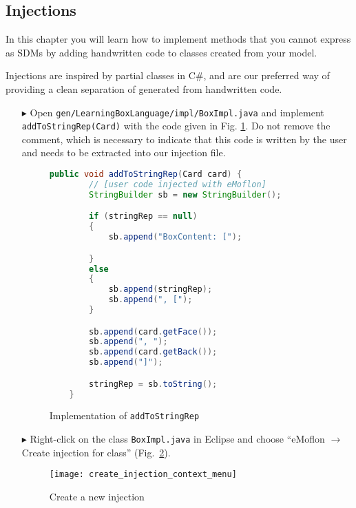 \newpage
\subsection{Injections}

In this chapter you will learn how to implement methods that you cannot express as SDMs by adding handwritten code to classes created from your model.

Injections are inspired by partial classes in C\#, and are our preferred way of providing a clean separation of generated from handwritten code.

\begin{enumerate}
    \item[$\blacktriangleright$] Open \texttt{gen/LearningBoxLanguage/impl/BoxImpl.java} and implement \texttt{addToStringRep(Card)} with the code given in Fig.
    \ref{fig:addToStringRep_impl}. Do not remove the comment, which is necessary to indicate that this code is written by the user and needs to be extracted
    into our injection file.

    \begin{figure}[htbp]
        \centering
        \begin{lstlisting}[language=Java, keywordstyle={\bfseries\color{purple}}, backgroundcolor=\color{white}]
    public void addToStringRep(Card card) {
        // [user code injected with eMoflon]
        StringBuilder sb = new StringBuilder();

        if (stringRep == null)
        {
            sb.append("BoxContent: [");

        }
        else
        {
            sb.append(stringRep);
            sb.append(", [");
        }

        sb.append(card.getFace());
        sb.append(", ");
        sb.append(card.getBack());
        sb.append("]");

        stringRep = sb.toString();
    }
        \end{lstlisting}
        \caption{Implementation of \texttt{addToStringRep}}
        \label{fig:addToStringRep_impl}
    \end{figure}

    \item[$\blacktriangleright$] Right-click on the class \texttt{BoxImpl.java} in Eclipse and choose ``eMoflon $\rightarrow$ Create injection for class''
    (Fig.~\ref{fig:injection_create_injection}).

    \begin{figure}[htbp]
        \centering
        \texttt{[image: create\_injection\_context\_menu]}
        \caption{Create a new injection}
        \label{fig:injection_create_injection}
    \end{figure}


\end{enumerate}
